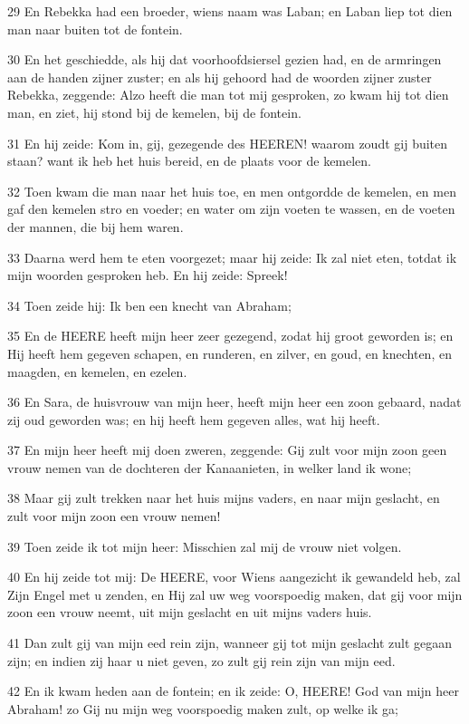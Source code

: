 \par 29 En Rebekka had een broeder, wiens naam was Laban; en Laban liep tot dien man naar buiten tot de fontein.
\par 30 En het geschiedde, als hij dat voorhoofdsiersel gezien had, en de armringen aan de handen zijner zuster; en als hij gehoord had de woorden zijner zuster Rebekka, zeggende: Alzo heeft die man tot mij gesproken, zo kwam hij tot dien man, en ziet, hij stond bij de kemelen, bij de fontein.
\par 31 En hij zeide: Kom in, gij, gezegende des HEEREN! waarom zoudt gij buiten staan? want ik heb het huis bereid, en de plaats voor de kemelen.
\par 32 Toen kwam die man naar het huis toe, en men ontgordde de kemelen, en men gaf den kemelen stro en voeder; en water om zijn voeten te wassen, en de voeten der mannen, die bij hem waren.
\par 33 Daarna werd hem te eten voorgezet; maar hij zeide: Ik zal niet eten, totdat ik mijn woorden gesproken heb. En hij zeide: Spreek!
\par 34 Toen zeide hij: Ik ben een knecht van Abraham;
\par 35 En de HEERE heeft mijn heer zeer gezegend, zodat hij groot geworden is; en Hij heeft hem gegeven schapen, en runderen, en zilver, en goud, en knechten, en maagden, en kemelen, en ezelen.
\par 36 En Sara, de huisvrouw van mijn heer, heeft mijn heer een zoon gebaard, nadat zij oud geworden was; en hij heeft hem gegeven alles, wat hij heeft.
\par 37 En mijn heer heeft mij doen zweren, zeggende: Gij zult voor mijn zoon geen vrouw nemen van de dochteren der Kanaanieten, in welker land ik wone;
\par 38 Maar gij zult trekken naar het huis mijns vaders, en naar mijn geslacht, en zult voor mijn zoon een vrouw nemen!
\par 39 Toen zeide ik tot mijn heer: Misschien zal mij de vrouw niet volgen.
\par 40 En hij zeide tot mij: De HEERE, voor Wiens aangezicht ik gewandeld heb, zal Zijn Engel met u zenden, en Hij zal uw weg voorspoedig maken, dat gij voor mijn zoon een vrouw neemt, uit mijn geslacht en uit mijns vaders huis.
\par 41 Dan zult gij van mijn eed rein zijn, wanneer gij tot mijn geslacht zult gegaan zijn; en indien zij haar u niet geven, zo zult gij rein zijn van mijn eed.
\par 42 En ik kwam heden aan de fontein; en ik zeide: O, HEERE! God van mijn heer Abraham! zo Gij nu mijn weg voorspoedig maken zult, op welke ik ga;
